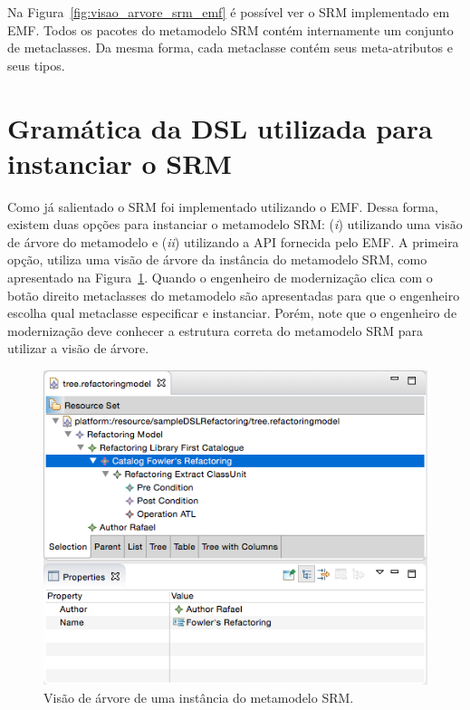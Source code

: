 Na Figura~\ref{fig:visao_arvore_srm_emf} é possível ver o SRM implementado em EMF. Todos os pacotes do metamodelo SRM contém internamente um conjunto de metaclasses. Da mesma forma, cada metaclasse contém seus meta-atributos e seus tipos.

\section{Gramática da DSL utilizada para instanciar o SRM}

Como já salientado o SRM foi implementado utilizando o EMF. Dessa forma, existem duas opções para instanciar o metamodelo SRM: (\textit{i}) utilizando uma visão de árvore do metamodelo e (\textit{ii}) utilizando a API fornecida pelo EMF. A primeira opção, utiliza uma visão de árvore da instância do metamodelo SRM, como apresentado na Figura~\ref{fig:visao_arvore_metamodelo_srm}. Quando o engenheiro de modernização clica com o botão direito metaclasses do metamodelo são apresentadas para que o engenheiro escolha qual metaclasse especificar e instanciar. Porém, note que o engenheiro de modernização deve conhecer a estrutura correta do metamodelo SRM para utilizar a visão de árvore. 

\begin{figure}[h]
	\centering
	\caption{Visão de árvore de uma instância do metamodelo SRM.}
	\label{fig:visao_arvore_metamodelo_srm}
	\includegraphics[scale=0.65]{images/tree_srm}
	\fautor
\end{figure}

